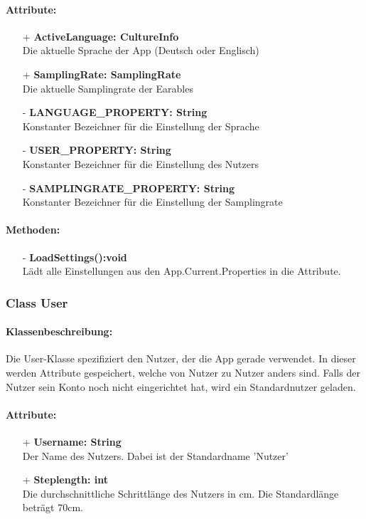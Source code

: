 \documentclass[a4paper,12pt]{article}
\begin{document}
	\paragraph{Attribute:}
	\begin{itemize}
		\item[+] \textbf{ActiveLanguage: CultureInfo}\\Die aktuelle Sprache der App (Deutsch oder Englisch)\\
		\item[+] \textbf{SamplingRate: SamplingRate}\\Die aktuelle Samplingrate der \Gls{Earables} \\ 
		\item[-] \textbf{LANGUAGE\_PROPERTY: String}\\Konstanter Bezeichner für die Einstellung der Sprache \\
		\item[-] \textbf{USER\_PROPERTY: String}\\Konstanter Bezeichner für die Einstellung des Nutzers \\
		\item[-] \textbf{SAMPLINGRATE\_PROPERTY: String}\\Konstanter Bezeichner für die Einstellung der Samplingrate \\
	\end{itemize}
	\paragraph{Methoden:}
	\begin{itemize}
		\item[-] \textbf{LoadSettings():void}\\Lädt alle Einstellungen aus den App.Current.Properties in die Attribute.	
	\end{itemize}
\subsubsection{Class User}
	\paragraph{Klassenbeschreibung:}
	Die User-Klasse spezifiziert den Nutzer, der die App gerade verwendet. In dieser werden Attribute gespeichert, welche von Nutzer zu Nutzer anders sind. Falls der Nutzer sein Konto noch nicht eingerichtet hat, wird ein Standardnutzer geladen.\\
	\paragraph{Attribute:}
	\begin{itemize}
		\item[+] \textbf{Username: String}\\Der Name des Nutzers. Dabei ist der Standardname 'Nutzer'\\
		\item[+] \textbf{Steplength: int}\\Die durchschnittliche Schrittlänge des Nutzers in cm. Die Standardlänge beträgt 70cm.\\
	\end{itemize}
\end{document}
